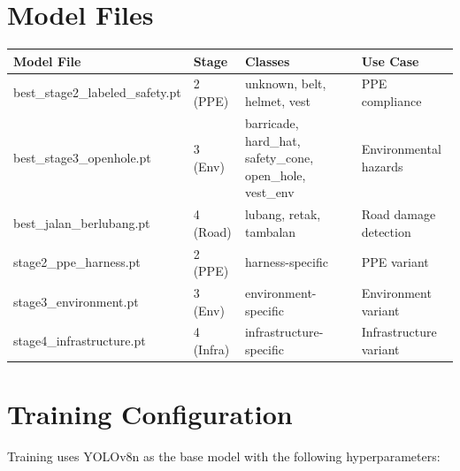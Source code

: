 \documentclass[12pt,a4paper,oneside]{book}
\begin{document}
\section{Model Files}

\begin{longtable}{|l|l|l|l|}
    \hline
    \textbf{Model File} & \textbf{Stage} & \textbf{Classes} & \textbf{Use Case} \\
    \hline
    best\_stage2\_labeled\_safety.pt & 2 (PPE) & unknown, belt, helmet, vest & PPE compliance \\
    \hline
    best\_stage3\_openhole.pt & 3 (Env) & barricade, hard\_hat, safety\_cone, open\_hole, vest\_env & Environmental hazards \\
    \hline
    best\_jalan\_berlubang.pt & 4 (Road) & lubang, retak, tambalan & Road damage detection \\
    \hline
    stage2\_ppe\_harness.pt & 2 (PPE) & harness-specific & PPE variant \\
    \hline
    stage3\_environment.pt & 3 (Env) & environment-specific & Environment variant \\
    \hline
    stage4\_infrastructure.pt & 4 (Infra) & infrastructure-specific & Infrastructure variant \\
    \hline
\end{longtable}

\section{Training Configuration}

Training uses YOLOv8n as the base model with the following hyperparameters:
\end{document}
